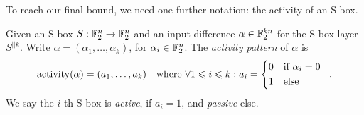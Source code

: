 To reach our final bound, we need one further notation: the activity of an S-box.
\begin{definition}\label{def:activity}
    Given an S-box $S : \mathbb{F}_2^n \to \mathbb{F}_2^n$ and an input difference $\alpha \in \mathbb{F}_2^{kn}$ for the S-box layer $S^{||k}$.
    Write $\alpha = (\alpha_1, \ldots, \alpha_k)$, for $\alpha_i \in \mathbb{F}_2^n$.
    The \emph{activity pattern} of $\alpha$ is
    \begin{equation*}
        \mathrm{activity}(\alpha) = (a_1, \ldots, a_k) \quad \text{where}\ \forall 1 \leqslant i \leqslant k : a_i = \begin{cases*}
            0 & if $\alpha_i = 0$ \\
            1 & else
        \end{cases*}\;.
    \end{equation*}
    We say the $i$-th S-box is \emph{active}, if $a_i = 1$, and \emph{passive} else.
\end{definition}


